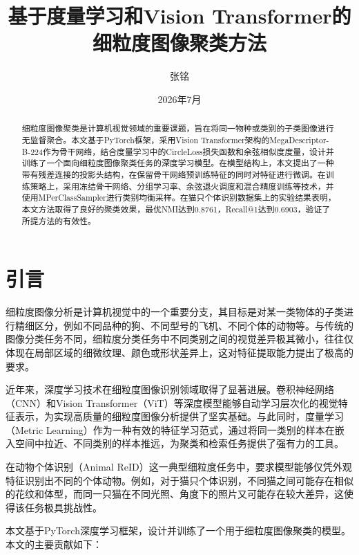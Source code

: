 \documentclass[a4paper]{article}
\title{\heiti\zihao{2} 基于度量学习和Vision Transformer的\\细粒度图像聚类方法}
\author{\songti 张铭\quad 2023192004}
\date{2026年7月}
\begin{document}
\maketitle

\begin{abstract}
\noindent
细粒度图像聚类是计算机视觉领域的重要课题，旨在将同一物种或类别的子类图像进行无监督聚合。本文基于PyTorch框架，采用Vision Transformer架构的MegaDescriptor-B-224作为骨干网络，结合度量学习中的CircleLoss损失函数和余弦相似度度量，设计并训练了一个面向细粒度图像聚类任务的深度学习模型。在模型结构上，本文提出了一种带有残差连接的投影头结构，在保留骨干网络预训练特征的同时对特征进行微调。在训练策略上，采用冻结骨干网络、分组学习率、余弦退火调度和混合精度训练等技术，并使用MPerClassSampler进行类别均衡采样。在猫只个体识别数据集上的实验结果表明，本文方法取得了良好的聚类效果，最优NMI达到0.8761，Recall@1达到0.6903，验证了所提方法的有效性。
\end{abstract}

\tableofcontents
\newpage

\section{引言}
\label{sec:intro}

细粒度图像分析是计算机视觉中的一个重要分支，其目标是对某一类物体的子类进行精细区分，例如不同品种的狗、不同型号的飞机、不同个体的动物等。与传统的图像分类任务不同，细粒度分类任务中不同类别之间的视觉差异极其微小，往往仅体现在局部区域的细微纹理、颜色或形状差异上，这对特征提取能力提出了极高的要求。

近年来，深度学习技术在细粒度图像识别领域取得了显著进展。卷积神经网络（CNN）和Vision Transformer（ViT）等深度模型能够自动学习层次化的视觉特征表示，为实现高质量的细粒度图像分析提供了坚实基础。与此同时，度量学习（Metric Learning）作为一种有效的特征学习范式，通过将同一类别的样本在嵌入空间中拉近、不同类别的样本推远，为聚类和检索任务提供了强有力的工具。

在动物个体识别（Animal ReID）这一典型细粒度任务中，要求模型能够仅凭外观特征识别出不同的个体动物。例如，对于猫只个体识别，不同猫之间可能存在相似的花纹和体型，而同一只猫在不同光照、角度下的照片又可能存在较大差异，这使得该任务极具挑战性。

本文基于PyTorch深度学习框架，设计并训练了一个用于细粒度图像聚类的模型。本文的主要贡献如下：
\end{document}

